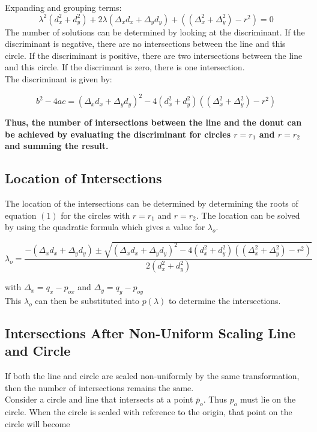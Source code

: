 \documentclass[a4paper,10pt]{scrartcl}
\begin{document}
Expanding and grouping terms:
\begin{equation}
 \lambda^2(d_x^2 + d_y^2) + 2\lambda(\Delta_xd_x + \Delta_yd_y) + ((\Delta_x^2 + \Delta_y^2) - r^2) = 0
\end{equation}
The number of solutions can be determined by looking at the discriminant. If the discriminant is negative, there are no intersections between the line and this circle.
If the discriminant is positive, there are two intersections between the line and this circle. If the discrimant is zero, there is one intersection.\\

The discriminant is given by: 

\[ b^2-4ac = (\Delta_xd_x + \Delta_yd_y)^2 - 4(d_x^2 + d_y^2) ((\Delta_x^2 + \Delta_y^2) - r^2) \]

{\bfseries Thus, the number of intersections between the line and the donut can be achieved by evaluating the discriminant for circles $r = r_1$ and $r = r_2$ and summing the result.}

\subsection{Location of Intersections}

The location of the intersections can be determined by determining the roots of equation $(1)$ for the circles with $r = r_1$ and $r = r_2$. The location can be solved by
using the quadratic formula which gives a value for $\lambda_o$.

\[ \lambda_o = \frac{-(\Delta_xd_x + \Delta_yd_y) \pm \sqrt{(\Delta_xd_x + \Delta_yd_y)^2 - 4(d_x^2 + d_y^2) ((\Delta_x^2 + \Delta_y^2) - r^2)}}{2(d_x^2 + d_y^2)}\]

with $\Delta_x = q_x - p_{ox}$ and $\Delta_y = q_y - p_{oy}$\\

This $\lambda_o$ can then be substituted into $p(\lambda)$ to determine the intersections.


\subsection{Intersections After Non-Uniform Scaling Line and Circle}

If both the line and circle are scaled non-uniformly by the same transformation, then the number of intersections remains the same. \\

Consider a circle and line that intersects at a point $\bar p_o$. Thus $p_o$ must lie on the circle. When the circle is scaled with reference to the origin, that point on the circle will become\\
\end{document}
